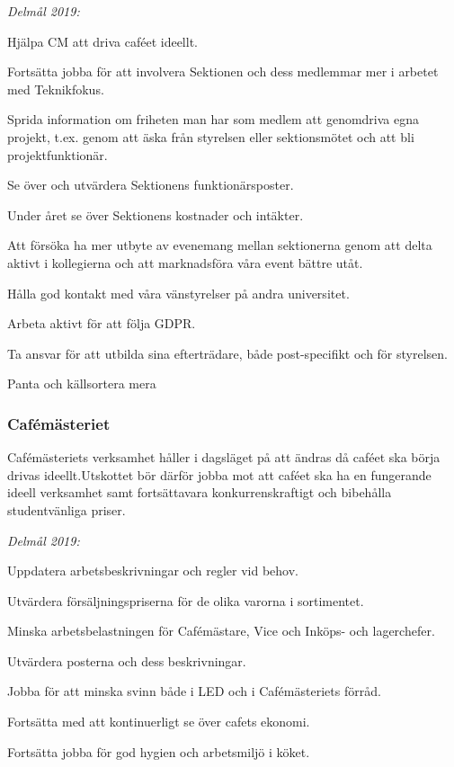 \documentclass[../_main/handlingar.tex]{subfiles}
\begin{document}
\emph{Delmål 2019:}
\begin{dashlist}
    \item Hjälpa CM att driva caféet ideellt. 
    \item Fortsätta jobba för att involvera Sektionen och dess medlemmar mer i arbetet med Teknikfokus. 
    \item Sprida information om friheten man har som medlem att genomdriva egna projekt, t.ex. genom att äska från styrelsen eller sektionsmötet och att bli projektfunktionär. 
    \item Se över och utvärdera Sektionens funktionärsposter. 
    \item Under året se över Sektionens kostnader och intäkter. 
    \item Att försöka ha mer utbyte av evenemang mellan sektionerna genom att delta aktivt i kollegierna och att marknadsföra våra event bättre utåt. 
    \item Hålla god kontakt med våra vänstyrelser på andra universitet.
    \item Arbeta aktivt för att följa GDPR.
    \item Ta ansvar för att utbilda sina efterträdare, både post-specifikt och för styrelsen.
    \item Panta och källsortera mera \scalebox{0.5}{\recycle}
\end{dashlist}
\newpage
\subsubsection*{Cafémästeriet}

Cafémästeriets verksamhet håller i dagsläget på att ändras då caféet ska börja drivas ideellt.Utskottet bör därför jobba mot att caféet ska ha en fungerande ideell verksamhet samt fortsättavara konkurrenskraftigt och bibehålla studentvänliga priser.

\emph{Delmål 2019:}
\begin{dashlist}
    \item Uppdatera arbetsbeskrivningar och regler vid behov. 
    \item Utvärdera försäljningspriserna för de olika varorna i sortimentet. 
    \item Minska arbetsbelastningen för Cafémästare, Vice och Inköps- och lagerchefer. 
    \item Utvärdera posterna och dess beskrivningar. 
    \item Jobba för att minska svinn både i LED och i Cafémästeriets förråd.
    \item Fortsätta med att kontinuerligt se över cafets ekonomi.
    \item Fortsätta jobba för god hygien och arbetsmiljö i köket.   
\end{dashlist}
\end{document}
